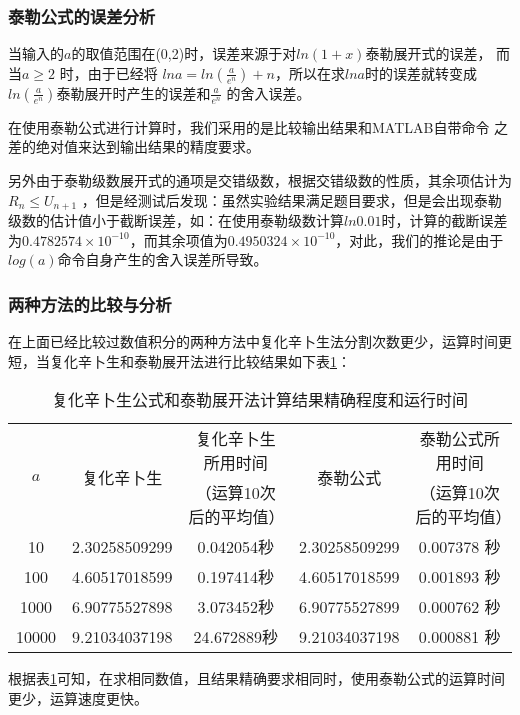 \documentclass[UTF8]{ctexart}
\begin{document}
	\subsubsection{泰勒公式的误差分析} %
	\par{当输入的$a$的取值范围在(0,2)时，误差来源于对$ln(1+x)$泰勒展开式的误差，
	而当$a\geq2$ 时，由于已经将 $lna=ln(\frac{a}{e^n})+n $，所以在求$lna$时的误差就转变成 $ln(\frac{a}{e^n})$泰勒展开时产生的误差和$\frac{a}{e^n}$ 的舍入误差。}
	\par{在使用泰勒公式进行计算时，我们采用的是比较输出结果和MATLAB自带命令 之差的绝对值来达到输出结果的精度要求。}
	\par{另外由于泰勒级数展开式的通项是交错级数，根据交错级数的性质，其余项估计为$R_n\leq U_{n+1}$ ，但是经测试后发现：虽然实验结果满足题目要求，但是会出现泰勒级数的估计值小于截断误差，如：在使用泰勒级数计算$ln0.01$时，计算的截断误差为$0.4782574\times10^{-10}$，而其余项值为$0.4950324\times10^{-10}$，对此，我们的推论是由于$log(a)$命令自身产生的舍入误差所导致。}
	
	\subsubsection{两种方法的比较与分析} %
	\par{在上面已经比较过数值积分的两种方法中复化辛卜生法分割次数更少，运算时间更短，当复化辛卜生和泰勒展开法进行比较结果如下表\ref{tab:BiJiaoShiJian}：}
	\begin{table}[!htbp]
		
		\caption{复化辛卜生公式和泰勒展开法计算结果精确程度和运行时间}%
		\centering
		\label{tab:BiJiaoShiJian} %
		\begin{tabular}{ccccc}
			\hline 
			\multirow{2}{*}{$a$} & \multirow{2}{*}{复化辛卜生} & 复化辛卜生所用时间 & \multirow{2}{*}{泰勒公式}& 泰勒公式所用时间 \\ 
			&&（运算10次后的平均值）&&（运算10次后的平均值）\\
			\hline 
			10 & 2.30258509299 & 0.042054秒 & 2.30258509299 & 0.007378 秒 \\ 
			100 & 4.60517018599 & 0.197414秒 & 4.60517018599 & 0.001893 秒 \\ 
			1000 & 6.90775527898 & 3.073452秒 & 6.90775527899 & 0.000762 秒 \\ 
			10000 & 9.21034037198 & 24.672889秒 & 9.21034037198 & 0.000881 秒 \\ 
			\hline 
		\end{tabular} 
	\end{table}	
	\par{根据表\ref{tab:BiJiaoShiJian}可知，在求相同数值，且结果精确要求相同时，使用泰勒公式的运算时间更少，运算速度更快。	}
\end{document}
